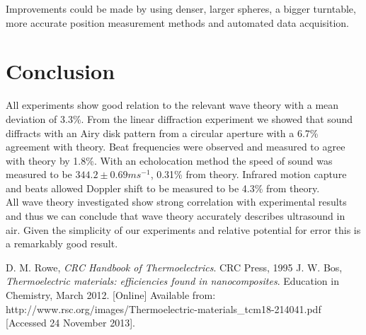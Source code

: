 \documentclass[a4paper,10pt,journal]{IEEEtran}
\begin{document}
Improvements could be made by using denser, larger spheres, a bigger turntable, more accurate position measurement methods and automated data acquisition.

\section{Conclusion}

All experiments show good relation to the relevant wave theory with a mean deviation of 3.3\%. From the linear diffraction experiment we showed that sound diffracts with an Airy disk pattern from a circular aperture with a 6.7\% agreement with theory. Beat frequencies were observed and measured to agree with theory by 1.8\%. With an echolocation method the speed of sound was measured to be $344.2 \pm 0.69 ms^{-1}$, 0.31\% from theory. Infrared motion capture and beats allowed Doppler shift to be measured to be 4.3\% from theory.\\
All wave theory investigated show strong correlation with experimental results and thus we can conclude that wave theory accurately describes ultrasound in air. Given the simplicity of our experiments and relative potential for error this is a remarkably good result.


\begin{thebibliography}{9}
D. M. Rowe, \emph{CRC Handbook of Thermoelectrics}. CRC Press, 1995
J. W. Bos, \emph{Thermoelectric materials: efficiencies found in
nanocomposites}. Education in Chemistry, March 2012. [Online] Available
from:
http://www.rsc.org/images/Thermoelectric-materials_tcm18-214041.pdf
[Accessed 24 November 2013].

\end{thebibliography}
\end{document}
